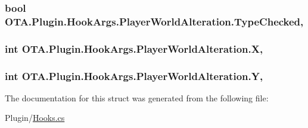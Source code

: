 \subsubsection[{Type\+Checked}]{\setlength{\rightskip}{0pt plus 5cm}bool O\+T\+A.\+Plugin.\+Hook\+Args.\+Player\+World\+Alteration.\+Type\+Checked\hspace{0.3cm}{\ttfamily [get]}, {\ttfamily [set]}}\label{struct_o_t_a_1_1_plugin_1_1_hook_args_1_1_player_world_alteration_ac9cdfc58acf049b0874116ded47cd016}
\hypertarget{struct_o_t_a_1_1_plugin_1_1_hook_args_1_1_player_world_alteration_a460dbb2ba6e3570ffb2fc56f9dab0952}{}
\subsubsection[{X}]{\setlength{\rightskip}{0pt plus 5cm}int O\+T\+A.\+Plugin.\+Hook\+Args.\+Player\+World\+Alteration.\+X\hspace{0.3cm}{\ttfamily [get]}, {\ttfamily [set]}}\label{struct_o_t_a_1_1_plugin_1_1_hook_args_1_1_player_world_alteration_a460dbb2ba6e3570ffb2fc56f9dab0952}
\hypertarget{struct_o_t_a_1_1_plugin_1_1_hook_args_1_1_player_world_alteration_a7b27ffaf74eb118c6615676880313a72}{}
\subsubsection[{Y}]{\setlength{\rightskip}{0pt plus 5cm}int O\+T\+A.\+Plugin.\+Hook\+Args.\+Player\+World\+Alteration.\+Y\hspace{0.3cm}{\ttfamily [get]}, {\ttfamily [set]}}\label{struct_o_t_a_1_1_plugin_1_1_hook_args_1_1_player_world_alteration_a7b27ffaf74eb118c6615676880313a72}


The documentation for this struct was generated from the following file\+:\begin{DoxyCompactItemize}
\item 
Plugin/\hyperlink{_hooks_8cs}{Hooks.\+cs}\end{DoxyCompactItemize}
